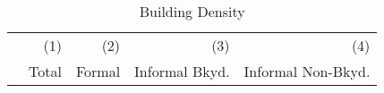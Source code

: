 \documentclass[12pt]{article}
\begin{document}
\begin{table}
\caption{Building Density}
\begin{tabular}{lDDDD}
\toprule
 & \small (1)  & \small (2) & \small (3) & \small (4) \\
 & Total & Formal   & Informal Bkyd. & Informal Non-Bkyd. \\ \midrule

\midrule
% 
\end{tabular}
\end{table}



% 
% 


% 
\end{document}
